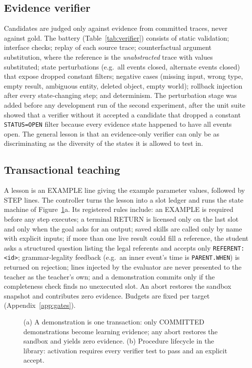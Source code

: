 \documentclass[10pt]{article}
\newcommand{\id}[1]{\nolinkurl{#1}}
\begin{document}
\subsection{Evidence verifier}\label{sec:verifier}
Candidates are judged only against evidence from committed traces, never against gold. The battery (Table~\ref{tab:verifier}) consists of static validation; interface checks; replay of each source trace; counterfactual argument substitution, where the reference is the \emph{unabstracted} trace with values substituted; state perturbations (e.g.\ all events closed, alternate events closed) that expose dropped constant filters; negative cases (missing input, wrong type, empty result, ambiguous entity, deleted object, empty world); rollback injection after every state-changing step; and determinism. The perturbation stage was added before any development run of the second experiment, after the unit suite showed that a verifier without it accepted a candidate that dropped a constant \id{STATUS=OPEN} filter because every evidence state happened to have all events open. The general lesson is that an evidence-only verifier can only be as discriminating as the diversity of the states it is allowed to test in.

\subsection{Transactional teaching}
A lesson is an EXAMPLE line giving the example parameter values, followed by STEP lines. The controller turns the lesson into a slot ledger and runs the state machine of Figure~\ref{fig:lifecycle}a. Its registered rules include: an EXAMPLE is required before any step executes; a terminal RETURN is licensed only on the last slot and only when the goal asks for an output; saved skills are called only by name with explicit inputs; if more than one live result could fill a reference, the student asks a structured question listing the legal referents and accepts only \texttt{REFERENT: <id>}; grammar-legality feedback (e.g.\ an inner event's time is \id{PARENT.WHEN}) is returned on rejection; lines injected by the evaluator are never presented to the teacher as the teacher's own; and a demonstration commits only if the completeness check finds no unexecuted slot. An abort restores the sandbox snapshot and contributes zero evidence. Budgets are fixed per target (Appendix~\ref{app:gates}).

\begin{figure}[t]
\centering
\resizebox{\linewidth}{!}{}
\caption{(a) A demonstration is one transaction: only COMMITTED demonstrations become learning evidence; any abort restores the sandbox and yields zero evidence. (b) Procedure lifecycle in the library: activation requires every verifier test to pass and an explicit accept.}
\label{fig:lifecycle}
\end{figure}
\end{document}
